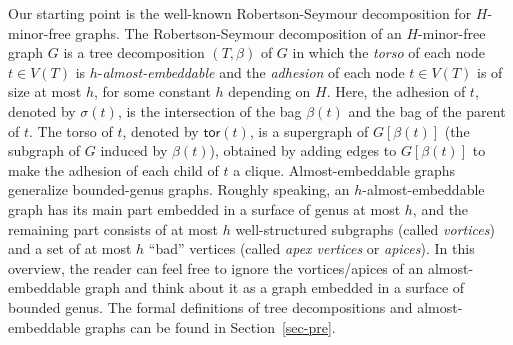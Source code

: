 \documentclass[a4paper,11pt]{article}
\numberwithin{lemma}{section}
\newcommand{\tor}{\mathsf{tor}}
\begin{document}
Our starting point is the well-known Robertson-Seymour decomposition for $H$-minor-free graphs.
The Robertson-Seymour decomposition of an $H$-minor-free graph $G$ is a tree decomposition $(T,\beta)$ of $G$ in which the \emph{torso} of each node $t \in V(T)$ is $h$-\emph{almost-embeddable} and the \emph{adhesion} of each node $t \in V(T)$ is of size at most $h$, for some constant $h$ depending on $H$.
Here, the adhesion of $t$, denoted by $\sigma(t)$, is the intersection of the bag $\beta(t)$ and the bag of the parent of $t$.
The torso of $t$, denoted by $\tor(t)$, is a supergraph of $G[\beta(t)]$ (the subgraph of $G$ induced by $\beta(t)$), obtained by adding edges to $G[\beta(t)]$ to make the adhesion of each child of $t$ a clique.
Almost-embeddable graphs generalize bounded-genus graphs.
Roughly speaking, an $h$-almost-embeddable graph has its main part embedded in a surface of genus at most $h$, and the remaining part consists of at most $h$ well-structured subgraphs (called \emph{vortices}) and a set of at most $h$ ``bad'' vertices (called \emph{apex vertices} or \emph{apices}).
In this overview, the reader can feel free to ignore the vortices/apices of an almost-embeddable graph and think about it as a graph embedded in a surface of bounded genus.
The formal definitions of tree decompositions and almost-embeddable graphs can be found in Section~\ref{sec-pre}.
\end{document}
